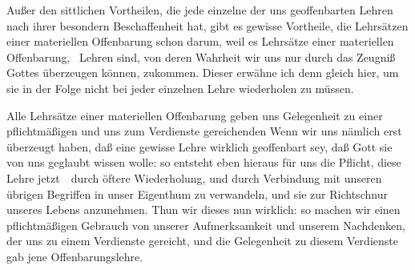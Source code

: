Außer den  sittlichen Vortheilen, die jede einzelne der uns geoffenbarten Lehren nach ihrer besondern Beschaffenheit hat, gibt es gewisse Vortheile, die  Lehrsätzen einer materiellen Offenbarung schon darum, weil es Lehrsätze einer materiellen Offenbarung, \dh\ Lehren sind, von deren Wahrheit wir uns nur durch das Zeugniß Gottes überzeugen können,  zukommen. Dieser erwähne ich denn gleich hier, um sie in der Folge nicht bei jeder einzelnen Lehre wiederholen zu müssen.
\begin{aufza}
\item Alle Lehrsätze einer materiellen Offenbarung geben uns Gelegenheit zu einer pflichtmäßigen und uns zum Verdienste gereichenden  Wenn wir uns nämlich erst überzeugt haben, daß eine gewisse Lehre wirklich geoffenbart sey, daß Gott sie von uns geglaubt wissen wolle: so entsteht eben hieraus für uns die Pflicht, diese Lehre jetzt~\ durch öftere Wiederholung, und durch Verbindung mit unseren übrigen Begriffen in unser Eigenthum zu verwandeln, und sie zur Richtschnur unseres Lebens anzunehmen. Thun wir dieses nun wirklich: so machen wir einen pflichtmäßigen Gebrauch von unserer Aufmerksamkeit und unserem Nachdenken, der uns zu einem Verdienste gereicht, und die Gelegenheit zu diesem Verdienste gab jene Offenbarungslehre.


\end{aufza}
